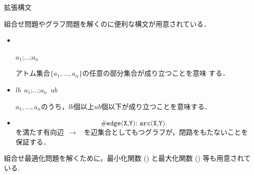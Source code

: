 \documentclass[dvipdfmx]{beamer}
\begin{document}
\begin{frame}[shrink]{拡張構文}
\begin{alertblock}{}\centering
  組合せ問題やグラフ問題を解くのに便利な構文が用意されている．
\end{alertblock}

\begin{itemize}
\item {}\\
  \begin{center}
   \code{\{}\(a_1\texttt{;}\dots\texttt{;}a_n\)\\
  \end{center}
  アトム集合\(\{a_1,\dots,a_n\}\)の任意の部分集合が成り立つことを意味
  する．
\item {}
  \begin{center}
   $lb$\ \code{\{}\(a_1\texttt{;}\dots\texttt{;}a_n\)\code{\}}\ $ub$
  \end{center}
  $a_1,\dots,a_n$のうち，$lb$個以上$ub$個以下が成り立つことを意味する．
\item {}
  \[
      \texttt{\#edge(X,Y): 
      arc(X,Y)}.
  \]
  を満たす有向辺~$\rightarrow$~
  を辺集合としてもつグラフが，閉路をもたないことを保証する．
\end{itemize}
\vfill
\pause
組合せ最適化問題を解くために，最小化関数 () 
と最大化関数 () 等も用意されている.
\end{frame}
\end{document}
